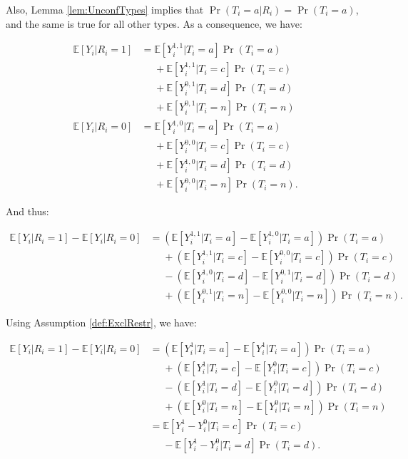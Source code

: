 \documentclass[
]{book}
\newcommand{\esp}[1]{\mathbb{E}[ #1 ]}
\theoremstyle{definition}
\theoremstyle{definition}
\theoremstyle{definition}
\theoremstyle{definition}
\theoremstyle{remark}
\begin{document}
Also, Lemma \ref{lem:UnconfTypes} implies that \(\Pr(T_i=a|R_i)=\Pr(T_i=a)\), and the same is true for all other types.
As a consequence, we have:

\begin{align*}
\esp{Y_i|R_i=1} & = \esp{Y_i^{1,1}|T_i=a}\Pr(T_i=a)\\
                & \phantom{=} + \esp{Y_i^{1,1}|T_i=c}\Pr(T_i=c) \\
                            & \phantom{=} + \esp{Y_i^{0,1}|T_i=d}\Pr(T_i=d)\\
                            & \phantom{=} + \esp{Y_i^{0,1}|T_i=n}\Pr(T_i=n)\\
\esp{Y_i|R_i=0} & = \esp{Y_i^{1,0}|T_i=a}\Pr(T_i=a)\\
                & \phantom{=} + \esp{Y_i^{0,0}|T_i=c}\Pr(T_i=c) \\                      
                                & \phantom{=} + \esp{Y_i^{1,0}|T_i=d}\Pr(T_i=d)\\
                                & \phantom{=} + \esp{Y_i^{0,0}|T_i=n}\Pr(T_i=n).
\end{align*}

And thus:

\begin{align*}
\esp{Y_i|R_i=1}-\esp{Y_i|R_i=0} & = (\esp{Y_i^{1,1}|T_i=a}-\esp{Y_i^{1,0}|T_i=a})\Pr(T_i=a)\\
                                & \phantom{=}+ (\esp{Y_i^{1,1}|T_i=c}-\esp{Y_i^{0,0}|T_i=c})\Pr(T_i=c) \\
                                            & \phantom{=} - (\esp{Y_i^{1,0}|T_i=d}-\esp{Y_i^{0,1}|T_i=d})\Pr(T_i=d)\\
                                            & \phantom{=} + (\esp{Y_i^{0,1}|T_i=n}-\esp{Y_i^{0,0}|T_i=n})\Pr(T_i=n).
\end{align*}

Using Assumption \ref{def:ExclRestr}, we have:

\begin{align*}
\esp{Y_i|R_i=1}-\esp{Y_i|R_i=0} & = (\esp{Y_i^{1}|T_i=a}-\esp{Y_i^{1}|T_i=a})\Pr(T_i=a)\\
                                & \phantom{=}+ (\esp{Y_i^{1}|T_i=c}-\esp{Y_i^{0}|T_i=c})\Pr(T_i=c) \\
                                            & \phantom{=} - (\esp{Y_i^{1}|T_i=d}-\esp{Y_i^{0}|T_i=d})\Pr(T_i=d)\\
                                            & \phantom{=} + (\esp{Y_i^{0}|T_i=n}-\esp{Y_i^{0}|T_i=n})\Pr(T_i=n)\\
                                            & = \esp{Y_i^{1}-Y_i^{0}|T_i=c}\Pr(T_i=c) \\
                                            & \phantom{=} - \esp{Y_i^{1}-Y_i^{0}|T_i=d}\Pr(T_i=d).
\end{align*}
\end{document}
